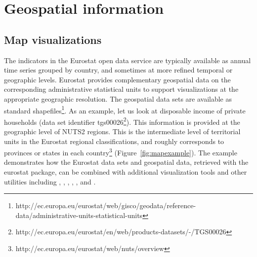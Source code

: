 \section{Geospatial information}

\subsection{Map visualizations}

The indicators in the Eurostat open data service are typically
available as annual time series grouped by country, and sometimes at
more refined temporal or geographic levels. Eurostat provides
complementary geospatial data on the corresponding administrative
statistical units to support visualizations at the appropriate
geographic resolution. The geospatial data sets are available as
standard
shapefiles\footnote{http://ec.europa.eu/eurostat/web/gisco/geodata/reference-data/administrative-units-statistical-units}. As
an example, let us look at disposable income of private households
(data set identifier
tgs00026\footnote{http://ec.europa.eu/eurostat/en/web/products-datasets/-/TGS00026}). This
information is provided at the geographic level of NUTS2 regions. This
is the intermediate level of territorial units in the Eurostat
regional classifications, and roughly corresponds to provinces or
states in each
country\footnote{http://ec.europa.eu/eurostat/web/nuts/overview}
(Figure~\ref{fig:mapexample}). The
example demonstrates how the Eurostat data sets and geospatial data,
retrieved with the eurostat package, can be combined with additional
visualization tools and other utilities including
 \citep{grid},  \citep{maptools},  \citep{rgdal},
 \citep{rgeos},  \citep{scales}, and
 \citep{stringr}.


